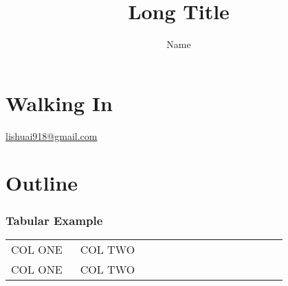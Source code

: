 \documentclass{beamer}
\title[Short Title]{Long Title}
\author{Name}
\date{}
\begin{document}
\section*{Walking In}
    \begin{frame}[plain, label=walk_in]
      \vspace{5mm}
      \begin{mdframed}[style=description]
          \begin{center}
            {\Huge \inserttitle}\linebreak
            \vspace{5mm}

            {\large \textsc{\insertauthor}}\linebreak
            \insertinstitute\linebreak
            \insertdate\linebreak
          \end{center}
          \begin{flushright}
            {\footnotesize
              \href{mailto: lishuai918@gmail.com}{{\faEnvelope}  lishuai918@gmail.com}
            }
          \end{flushright}
      \end{mdframed}
    \end{frame}
\note{}


\section*{Outline}
\frame{\tableofcontents[pausesections]}


\begin{frame}
  \frametitle{Tabular Example}

  \begin{tabular}{|p{0.2\linewidth}|p{0.6\linewidth}|}
    COL ONE & COL TWO \pause \\
    COL ONE & COL TWO        \\
  \end{tabular}
\end{frame}
\end{document}
